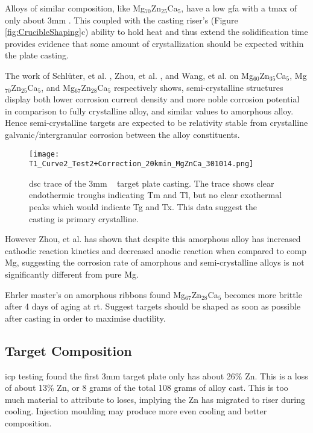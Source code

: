 \documentclass[a4paper,12pt,oneside]{report}%
\begin{document}
Alloys of similar composition, like Mg$_{70}$Zn$_{25}$Ca$_{5}$, have a low \gls{gfa} with a \gls{tmax} of only about 3mm \cite{Gu2005, Zhou2013}. This coupled with the casting riser's (Figure \ref{fig:CrucibleShaping}c) ability to hold heat and thus extend the solidification time provides evidence that some amount of crystallization should be expected within the plate casting. 

The work of Schlüter, et al. \cite{Schluter2012}, Zhou, et al. \cite{Zhou2013}, and Wang, et al. \cite{Wang2012} on Mg$_{60}$Zn$_{35}$Ca$_{5}$, Mg$_{70}$Zn$_{25}$Ca$_{5}$, and Mg$_{67}$Zn$_{28}$Ca$_{5}$ respectively shows, semi-crystalline structures display both lower corrosion current density and more noble corrosion potential in comparison to fully crystalline alloy, and similar values to amorphous alloy. Hence semi-crystalline targets are expected to be relativity stable from crystalline galvanic/intergranular corrosion between the alloy constituents. 

\begin{figure}[htbp]
	\centering
	\texttt{[image: T1\_Curve2\_Test2+Correction\_20kmin\_MgZnCa\_301014.png]}
	\caption{\acrshort{dsc} trace of the 3mm \MgZnCa~ target plate casting. The trace shows clear endothermic troughs indicating \acrshort{Tm} and \acrshort{Tl}, but no clear exothermal peaks which would indicate \acrshort{Tg} and \acrshort{Tx}. This data suggest the casting is primary crystalline.}
	\label{fig:DSCTarget1}
\end{figure}

However Zhou, et al. \cite{Zhou2013} has shown that despite this amorphous alloy has increased cathodic reaction kinetics and decreased anodic reaction when compared to \acrshort{comp} Mg, suggesting the corrosion rate of amorphous and semi-crystalline alloys is not significantly different from pure Mg. 

Ehrler \cite{Ehrler2008} master's on amorphous ribbons found Mg$_{67}$Zn$_{28}$Ca$_{5}$ becomes more brittle after 4 days of aging at \gls{rt}. Suggest targets should be shaped as soon as possible after casting in order to maximise ductility. 

\subsection{Target Composition}

\Acrshort{icp} testing found the first 3mm target plate only has about 26\% Zn. This is a loss of about 13\% Zn, or 8 grams of the total 108 grams of alloy cast.  This is too much material to attribute to loses, implying the Zn has migrated to riser during cooling. Injection moulding may produce more even cooling and better composition. 
\end{document}
